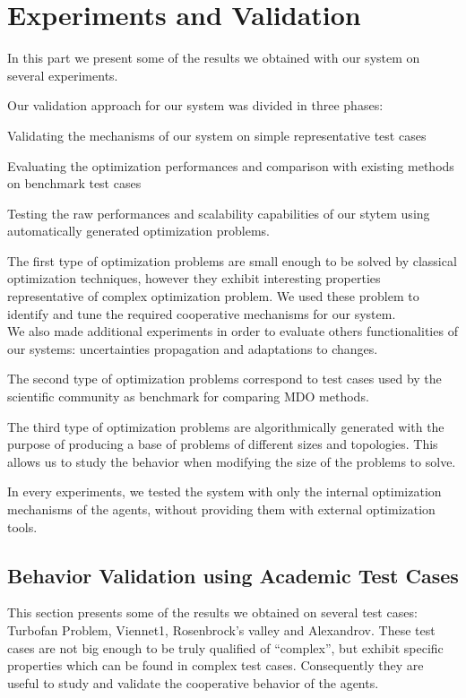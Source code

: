 \part{Experiments and Validation}

In this part we present some of the results we obtained with our system on several experiments.

Our validation approach for our system was divided in three phases:
\begin{compactitem}
\item Validating the mechanisms of our system on simple representative test cases
\item Evaluating the optimization performances and comparison with existing methods on benchmark test cases
\item Testing the raw performances and scalability capabilities of our stytem using automatically generated optimization problems.
\end{compactitem}

The first type of optimization problems are small enough to be solved by classical optimization techniques, however they exhibit interesting properties representative of complex optimization problem. We used these problem to identify and tune the required cooperative mechanisms for our system.\\
We also made additional experiments in order to evaluate others functionalities of our systems: uncertainties propagation and adaptations to changes.

The second type of optimization problems correspond to test cases used by the scientific community as benchmark for comparing MDO methods.

The third type of optimization problems are algorithmically generated with the purpose of producing a base of problems of different sizes and topologies. This allows us to study the behavior when modifying the size of the problems to solve.

In every experiments, we tested the system with only the internal optimization mechanisms of the agents, without providing them with external optimization tools.

\chapter{Behavior Validation using Academic Test Cases}

This section presents some of the results we obtained on several test cases: Turbofan Problem, Viennet1, Rosenbrock's valley and Alexandrov. These test cases are not big enough to be truly qualified of \enquote{complex}, but exhibit specific properties which can be found in complex test cases. Consequently they are useful to study and validate the cooperative behavior of the agents.

